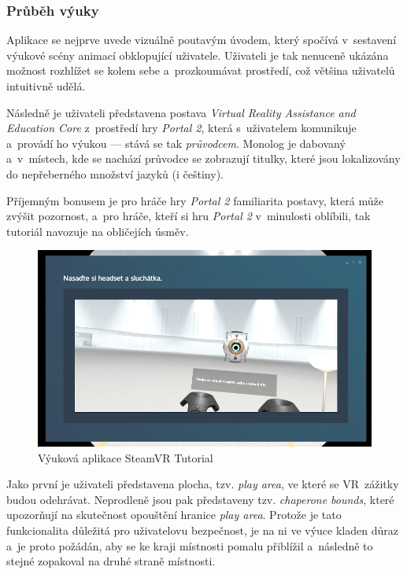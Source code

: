 \subsubsection{Průběh výuky}\label{prux16fbux11bh-vuxfduky}

Aplikace se nejprve uvede vizuálně poutavým úvodem, který spočívá
v~sestavení výukové scény animací obklopující uživatele. Uživateli je tak nenuceně
ukázána možnost rozhlížet se kolem sebe a~prozkoumávat prostředí, což
většina uživatelů intuitivně udělá.

Následně je uživateli představena postava \emph{Virtual Reality
Assistance and Education Core} z~prostředí hry \emph{Portal 2}, která s~uživatelem
komunikuje a~provádí ho výukou --- stává se tak \emph{průvodcem}. Monolog
je dabovaný a~v~místech, kde se nachází průvodce se zobrazují titulky,
které jsou lokalizovány do nepřeberného množství jazyků (i češtiny).

Příjemným bonusem je pro hráče hry \emph{Portal 2} familiarita postavy, která
může zvýšit pozornost, a~pro hráče, kteří si hru \emph{Portal 2}
v~minulosti oblíbili, tak tutoriál navozuje na obličejích úsměv.

\begin{figure}[h!]
\centering
\includegraphics[width=12cm]{src/assets/steamvr-tutorial.png}
\caption{Výuková aplikace SteamVR Tutorial}
\end{figure}

Jako první je uživateli představena plocha, tzv. \emph{play area}, ve
které se VR~zážitky budou odehrávat. Neprodleně jsou pak představeny
tzv. \emph{chaperone bounds}, které upozorňují na skutečnost opouštění 
hranice \emph{play area}. Protože je tato funkcionalita
důležitá pro uživatelovu bezpečnost, je na ni ve výuce kladen důraz a~je proto
požádán, aby se ke kraji místnosti pomalu přiblížil a~následně to stejné
zopakoval na druhé straně místnosti.


